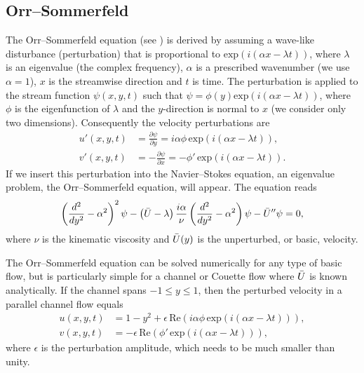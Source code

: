 \subsection{Orr--Sommerfeld}
\label{sec:mortensen:OS}

The Orr--Sommerfeld equation (see \citet{Orzag1971}) is derived by
assuming a wave-like disturbance (perturbation) that is proportional to
$\text{exp}(i(\alpha x-\lambda t))$, where $\lambda$ is an eigenvalue
(the complex frequency), $\alpha$
is a prescribed wavenumber (we use $\alpha=1$), $x$ is the streamwise
direction and $t$ is time. The perturbation is applied to the stream
function $\psi(x,y,t)$ such that $\psi=\phi(y) \text{exp}(i(\alpha
x- \lambda t))$, where $\phi$ is the eigenfunction of $\lambda$
and the $y$-direction is normal to $x$ (we consider only two
dimensions). Consequently the velocity perturbations are
\begin{align}
 u'(x,y,t)&=\frac{\partial \psi}{\partial y}=i\alpha \phi \, \text{exp}(i(\alpha x- \lambda t)),
\\
 v'(x,y,t)&=-\frac{\partial \psi}{\partial x}=-\phi' \, \text{exp}(i(\alpha x- \lambda t)).
\end{align}
If we insert this perturbation into the Navier--Stokes equation, an
eigenvalue problem, the Orr--Sommerfeld equation, will appear. The
equation reads
\begin{equation}
 \left( \frac{d^2}{dy^2}-\alpha^2\right)^2\psi
      - \left(\Bar{U}-\lambda \right) \frac{i \alpha}{\nu}
          \left( \frac{d^2}{dy^2}-\alpha^2\right)\psi - \Bar{U}''\psi=0,
 \label{eq:mortensen:OrrS}
\end{equation}
where $\nu$ is the kinematic viscosity and $\Bar{U}(y)$ is the
unperturbed, or basic, velocity.

The Orr--Sommerfeld equation can be solved numerically for any type of
basic flow, but is particularly simple for a channel or Couette flow
where $\Bar{U}$ is known analytically. If the channel spans
$-1\leqslant y \leqslant 1$, then the perturbed velocity in a parallel
channel flow equals
\begin{equation}
\begin{split}
 u(x,y,t)&=1-y^2+\epsilon \,\text{Re}\left(i\alpha \phi \, \text{exp}(i(\alpha x-\lambda t))\right),
\\
 v(x,y,t)&=-\epsilon \, \text{Re}\left(\phi' \, \text{exp}(i(\alpha x-\lambda t))\right),
\end{split}
\label{eq:mortensen:channel}
\end{equation}
where $\epsilon$ is the perturbation amplitude, which needs to be much
smaller than unity.

